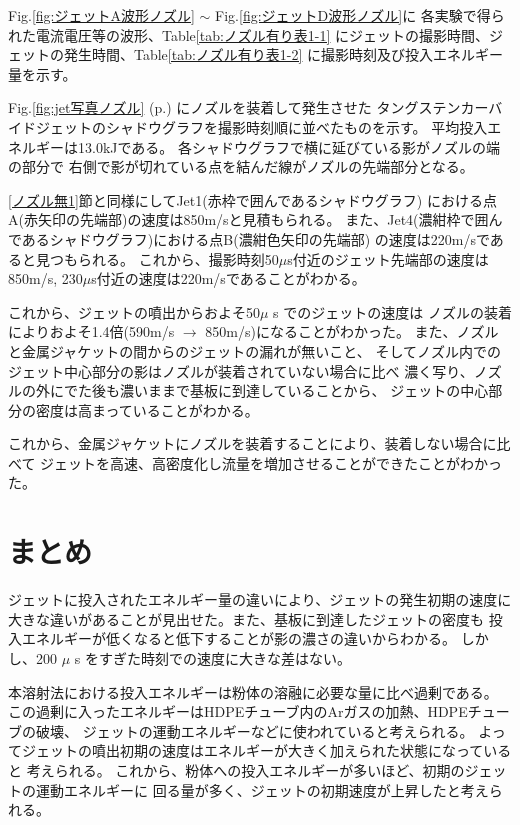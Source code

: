Fig.\ref{fig:ジェットA波形ノズル} $\sim$ Fig.\ref{fig:ジェットD波形ノズル}に
各実験で得られた電流電圧等の波形、Table\ref{tab:ノズル有り表1-1}
にジェットの撮影時間、ジェットの発生時間、Table\ref{tab:ノズル有り表1-2}
に撮影時刻及び投入エネルギー量を示す。

Fig.\ref{fig:jet写真ノズル} (p.\pageref{fig:jet写真ノズル})
にノズルを装着して発生させた
タングステンカーバイドジェットのシャドウグラフを撮影時刻順に並べたものを示す。
平均投入エネルギーは13.0kJである。
各シャドウグラフで横に延びている影がノズルの端の部分で
右側で影が切れている点を結んだ線がノズルの先端部分となる。

\ref{ノズル無1}節と同様にしてJet1(赤枠で囲んであるシャドウグラフ)
における点A(赤矢印の先端部)の速度は850m/sと見積もられる。
また、Jet4(濃紺枠で囲んであるシャドウグラフ)における点B(濃紺色矢印の先端部)
の速度は220m/sであると見つもられる。
これから、撮影時刻50$\mu$s付近のジェット先端部の速度は850m/s,
230$\mu$s付近の速度は220m/sであることがわかる。


これから、ジェットの噴出からおよそ50$\mu$ s でのジェットの速度は
ノズルの装着によりおよそ1.4倍(590m/s $\to$ 850m/s)になることがわかった。
また、ノズルと金属ジャケットの間からのジェットの漏れが無いこと、
そしてノズル内でのジェット中心部分の影はノズルが装着されていない場合に比べ
濃く写り、ノズルの外にでた後も濃いままで基板に到達していることから、
ジェットの中心部分の密度は高まっていることがわかる。

これから、金属ジャケットにノズルを装着することにより、装着しない場合に比べて
ジェットを高速、高密度化し流量を増加させることができたことがわかった。

\section{まとめ}

ジェットに投入されたエネルギー量の違いにより、ジェットの発生初期の速度に
大きな違いがあることが見出せた。また、基板に到達したジェットの密度も
投入エネルギーが低くなると低下することが影の濃さの違いからわかる。
しかし、200 $\mu$ s をすぎた時刻での速度に大きな差はない。

本溶射法における投入エネルギーは粉体の溶融に必要な量に比べ過剰である。
この過剰に入ったエネルギーはHDPEチューブ内のArガスの加熱、HDPEチューブの破壊、
ジェットの運動エネルギーなどに使われていると考えられる。
よってジェットの噴出初期の速度はエネルギーが大きく加えられた状態になっていると
考えられる。
これから、粉体への投入エネルギーが多いほど、初期のジェットの運動エネルギーに
回る量が多く、ジェットの初期速度が上昇したと考えられる。

